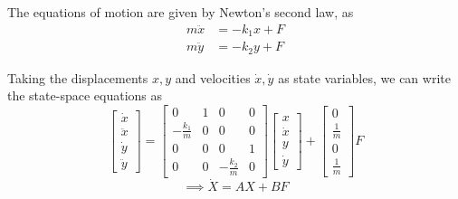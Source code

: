 The equations of motion are given by Newton's second law, as
\begin{align*}
    m\ddot{x}
     & = -k_{1}x + F
    \\
    m\ddot{y}
     & = -k_{2}y + F
\end{align*}

Taking the displacements \( x, y \) and velocities \( \dot{x}, \dot{y} \) as state variables, we can write the state-space equations as
\begin{equation*}
    \boxed{
        \begin{bmatrix}
            \dot{x}  \\
            \ddot{x} \\
            \dot{y}  \\
            \ddot{y}
        \end{bmatrix}
        =
        \begin{bmatrix}
            0                & 1 & 0                & 0 \\
            -\frac{k_{1}}{m} & 0 & 0                & 0 \\
            0                & 0 & 0                & 1 \\
            0                & 0 & -\frac{k_{2}}{m} & 0
        \end{bmatrix}
        \begin{bmatrix}
            x       \\
            \dot{x} \\
            y       \\
            \dot{y}
        \end{bmatrix}
        +
        \begin{bmatrix}
            0           \\
            \frac{1}{m} \\
            0           \\
            \frac{1}{m}
        \end{bmatrix}
        F
    }
\end{equation*}
\begin{equation*}
    \implies
    \dot X
    =
    AX + BF
\end{equation*}
